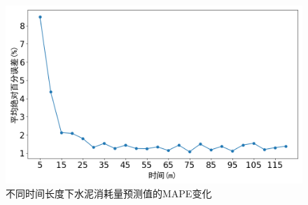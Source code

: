 



\begin{figure}
    \centering
    \includegraphics[width=0.8\linewidth]{figures/chapter4/mape.png}
    \caption{不同时间长度下水泥消耗量预测值的MAPE变化}
    \label{fig:cement_mape_evolution}
\end{figure}




